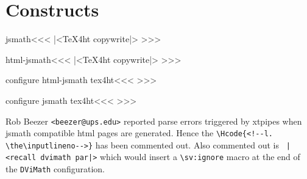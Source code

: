 %
%
%  

\ifx \HTML\UnDef
   \def\HTML{jsmath,html-jsmath} 
   \def\CONFIG{\jobname}
   \def\MAKETITLE{\author{Eitan M. Gurari}}
   \def\next{  \endinput}
   \expandafter\next
\fi






\chapter{Constructs}



\<jsmath\><<<
|<TeX4ht copywrite|>
>>>

\<html-jsmath\><<<
|<TeX4ht copywrite|>
>>>


\<configure html-jsmath tex4ht\><<<
>>>


\<configure jsmath tex4ht\><<<
>>>


Rob Beezer \texttt{<beezer@ups.edu>} reported parse errors triggered
by xtpipes when jsmath compatible html pages are generated. Hence the
\verb=\Hcode{<!--l. \the\inputlineno-->}= has been commented out. Also
commented out is \verb= |<recall dvimath par|>= which would insert a
\verb=\sv:ignore= macro at the end of the \verb=DViMath=
configuration.


